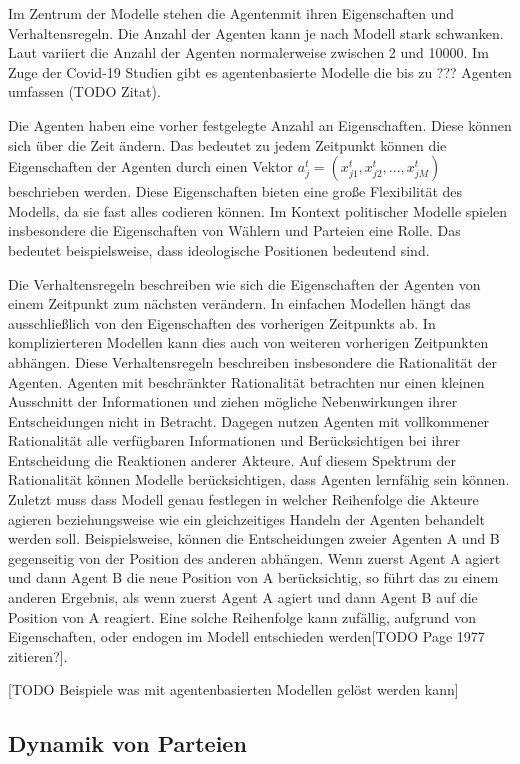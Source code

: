 Im Zentrum der Modelle stehen die Agentenmit ihren Eigenschaften und Verhaltensregeln. Die Anzahl der Agenten kann je nach Modell stark schwanken. Laut \citet{marchi2014ABMs} variiert die Anzahl der Agenten normalerweise zwischen 2 und 10000. Im Zuge der Covid-19 Studien gibt es agentenbasierte Modelle die bis zu ??? Agenten umfassen (TODO Zitat).

Die Agenten haben eine vorher festgelegte Anzahl an Eigenschaften. Diese können sich über die Zeit ändern. Das bedeutet zu jedem Zeitpunkt können die Eigenschaften der Agenten durch einen Vektor $a_j^t = (x_{j1}^t, x_{j2}^t,..., x_{jM}^t)$ beschrieben werden. Diese Eigenschaften bieten eine große Flexibilität des Modells, da sie fast alles codieren können. Im Kontext politischer Modelle spielen insbesondere die Eigenschaften von Wählern und Parteien eine Rolle. Das bedeutet beispielsweise, dass ideologische Positionen bedeutend sind.

Die Verhaltensregeln beschreiben wie sich die Eigenschaften der Agenten von einem Zeitpunkt zum nächsten verändern. In einfachen Modellen hängt das ausschließlich von den Eigenschaften des vorherigen Zeitpunkts ab. In komplizierteren Modellen kann dies auch von weiteren vorherigen Zeitpunkten abhängen. Diese Verhaltensregeln beschreiben insbesondere die Rationalität der Agenten. Agenten mit beschränkter Rationalität betrachten nur einen kleinen Ausschnitt der Informationen und ziehen mögliche Nebenwirkungen ihrer Entscheidungen nicht in Betracht. Dagegen nutzen Agenten mit vollkommener Rationalität alle verfügbaren Informationen und Berücksichtigen bei ihrer Entscheidung die Reaktionen anderer Akteure. Auf diesem Spektrum der Rationalität können Modelle berücksichtigen, dass Agenten lernfähig sein können. Zuletzt muss dass Modell genau festlegen in welcher Reihenfolge die Akteure agieren beziehungsweise wie ein gleichzeitiges Handeln der Agenten behandelt werden soll. Beispielsweise, können die Entscheidungen zweier Agenten A und B gegenseitig von der Position des anderen abhängen. Wenn zuerst Agent A agiert und dann Agent B die neue Position von A berücksichtig, so führt das zu einem anderen Ergebnis, als wenn zuerst Agent A agiert und dann Agent B auf die Position von A reagiert. Eine solche Reihenfolge kann zufällig, aufgrund von Eigenschaften, oder endogen im Modell entschieden werden[TODO Page 1977 zitieren?].

[TODO Beispiele was mit agentenbasierten Modellen gelöst werden kann]

\subsection{Dynamik von Parteien} \label{sec:ABM-Dynamik}

